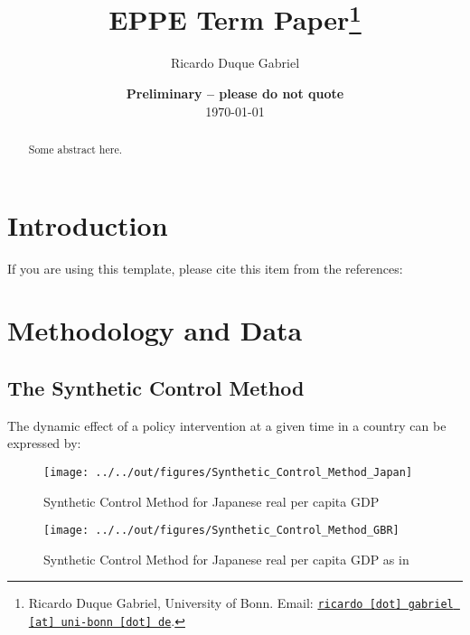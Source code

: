 \documentclass[11pt, a4paper, leqno]{article}
\begin{document}
\title{EPPE Term Paper\thanks{Ricardo Duque Gabriel, University of Bonn. Email: \href{mailto:ricardo.gabriel@uni-bonn.de}{\nolinkurl{ricardo [dot] gabriel [at] uni-bonn [dot] de}}.}}

\author{Ricardo Duque Gabriel}

\date{
{\bf Preliminary -- please do not quote} 
\\[1ex] 
\today
}

\maketitle


\begin{abstract}
	Some abstract here.
\end{abstract}
\clearpage

\section{Introduction} %
\label{sec:introduction}

If you are using this template, please cite this item from the references: \citet{GaudeckerEconProjectTemplates}


\section{Methodology and Data}

\subsection{The Synthetic Control Method}
The dynamic effect of a policy intervention at a given time in a country can be expressed by: 


\begin{figure}
    \caption{Synthetic Control Method for Japanese real per capita GDP}
    
    \texttt{[image: ../../out/figures/Synthetic\_Control\_Method\_Japan]}

\end{figure}


\begin{figure}
    \caption{Synthetic Control Method for Japanese real per capita GDP as in \citet{Born2018}}
    
    \texttt{[image: ../../out/figures/Synthetic\_Control\_Method\_GBR]}

\end{figure}




\newpage






\end{document}
